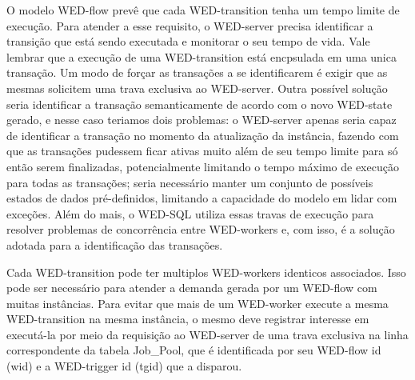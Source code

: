 \documentclass[conference]{IEEEtran}
\begin{document}
\par O modelo WED-flow prevê que cada WED-transition tenha um tempo limite de execução. Para atender a esse requisito, o WED-server
precisa identificar a transição que está sendo executada e monitorar o seu tempo de vida. Vale lembrar que a execução de uma
WED-transition está encpsulada em uma unica transação. Um modo de forçar as transações a se identificarem é exigir que as mesmas
solicitem uma trava exclusiva ao WED-server. Outra possível solução seria identificar a transação semanticamente de acordo
com o novo WED-state gerado, e nesse caso teriamos dois problemas: o WED-server apenas seria capaz de identificar a transação
no momento da atualização da instância, fazendo com que as transações pudessem ficar ativas muito além de seu tempo limite para
só então serem finalizadas, potencialmente limitando o tempo máximo de execução para todas as transações; seria necessário manter 
um conjunto de possíveis estados de dados pré-definidos, limitando a capacidade do modelo em lidar com exceções. Além do mais,
o WED-SQL utiliza essas travas de execução para resolver problemas de concorrência entre WED-workers e, com isso,
é a solução adotada para a identificação das transações. 


\par Cada WED-transition pode ter multiplos WED-workers identicos associados. Isso pode ser necessário para atender a demanda 
gerada por um WED-flow com muitas instâncias. Para evitar que mais de um WED-worker execute a mesma WED-transition na mesma
instância, o mesmo deve registrar interesse em executá-la por meio da requisição ao WED-server de uma trava exclusiva na linha
correspondente da tabela Job\_Pool, que é identificada por seu WED-flow id (wid) e a WED-trigger id (tgid) que a disparou.
\end{document}
